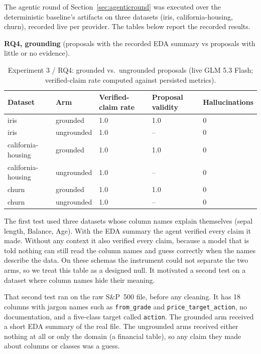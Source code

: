 The agentic round of Section~\ref{sec:agenticround} was executed over the deterministic baseline's artifacts on three datasets (iris, california-housing, churn), recorded live per provider. The tables below report the recorded results.

\textbf{RQ4, grounding} (proposals with the recorded EDA summary vs proposals with little or no evidence).

\begin{table}[H]
\centering
\caption{Experiment 3 / RQ4: grounded vs.\ ungrounded proposals (live GLM 5.3 Flash; verified-claim rate computed against persisted metrics).}
\label{tab:rq4}
\small
\begin{tabular}{p{3.2cm}p{3.4cm}p{2.6cm}p{2.6cm}p{2.2cm}}
\toprule
\textbf{Dataset} & \textbf{Arm} & \textbf{Verified-claim rate} & \textbf{Proposal validity} & \textbf{Hallucinations} \\
\midrule
iris & grounded & 1.0 & 1.0 & 0 \\
iris & ungrounded & 1.0 & -- & 0 \\
california-housing & grounded & 1.0 & 1.0 & 0 \\
california-housing & ungrounded & 1.0 & -- & 0 \\
churn & grounded & 1.0 & 1.0 & 0 \\
churn & ungrounded & 1.0 & -- & 0 \\
\bottomrule
\end{tabular}
\end{table}

The first test used three datasets whose column names explain themselves (sepal length, Balance, Age). With the EDA summary the agent verified every claim it made. Without any context it also verified every claim, because a model that is told nothing can still read the column names and guess correctly when the names describe the data. On these schemas the instrument could not separate the two arms, so we treat this table as a designed null. It motivated a second test on a dataset where column names hide their meaning.

That second test ran on the raw S\&P~500 file, before any cleaning. It has 18 columns with jargon names such as \texttt{from\_grade} and \texttt{price\_target\_action}, no documentation, and a five-class target called \texttt{action}. The grounded arm received a short EDA summary of the real file. The ungrounded arms received either nothing at all or only the domain (a financial table), so any claim they made about columns or classes was a guess.

